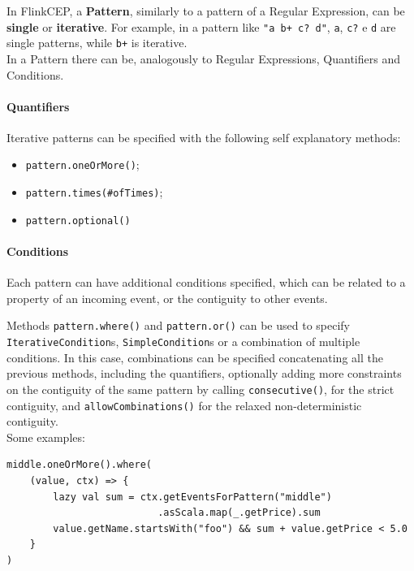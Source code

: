 In FlinkCEP, a \textbf{Pattern}, similarly to a pattern of a Regular Expression, can be \textbf{single} or \textbf{iterative}. For example, in a pattern like \verb|"a b+ c? d"|, \verb|a|, \verb|c?| e \verb|d| are single patterns, while \verb|b+| is iterative.
\\

In a Pattern there can be, analogously to Regular Expressions, Quantifiers and Conditions.

\paragraph{Quantifiers}

Iterative patterns can be specified with the following self explanatory methods:

\begin{itemize}
    \item \verb|pattern.oneOrMore()|;
    \item \verb|pattern.times(#ofTimes)|;
    \item \verb|pattern.optional()|
\end{itemize}

\paragraph{Conditions}

Each pattern can have additional conditions specified, which can be related to a property of an incoming event, or the contiguity to other events.

Methods \verb|pattern.where()| and \verb|pattern.or()| can be used to specify \verb|IterativeCondition|s, \verb|SimpleCondition|s or a combination of multiple conditions. In this case, combinations can be specified concatenating all the previous methods, including the quantifiers, optionally adding more constraints on the contiguity of the same pattern by calling \verb|consecutive()|, for the strict contiguity, and \verb|allowCombinations()| for the relaxed non-deterministic contiguity.
\\
Some examples:

\begin{code}
\label{code:iterative-cond}
\begin{verbatim}
middle.oneOrMore().where(
    (value, ctx) => {
        lazy val sum = ctx.getEventsForPattern("middle")
                          .asScala.map(_.getPrice).sum
        value.getName.startsWith("foo") && sum + value.getPrice < 5.0
    }
)
\end{verbatim}
\end{code}~\\

